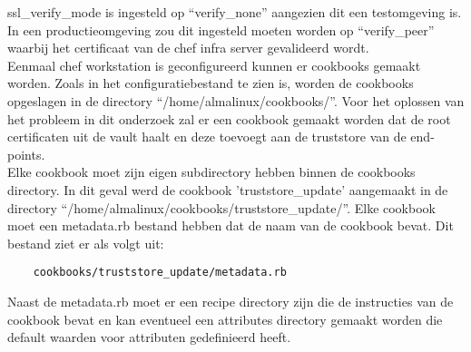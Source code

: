 ssl\_verify\_mode is ingesteld op ``verify\_none'' aangezien dit een testomgeving is. In een productieomgeving zou dit ingesteld moeten worden op ``verify\_peer'' waarbij het certificaat van de chef infra server gevalideerd wordt. \\

Eenmaal chef workstation is geconfigureerd kunnen er cookbooks gemaakt worden. Zoals in het configuratiebestand te zien is, worden de cookbooks opgeslagen in de directory ``/home/almalinux/cookbooks/''.
Voor het oplossen van het probleem in dit onderzoek zal er een cookbook gemaakt worden dat de root certificaten uit de vault haalt en deze toevoegt aan de truststore van de end-points. \\

Elke cookbook moet zijn eigen subdirectory hebben binnen de cookbooks directory.
In dit geval werd de cookbook 'truststore\_update' aangemaakt in de directory ``/home/almalinux/cookbooks/truststore\_update/''. Elke cookbook moet een metadata.rb bestand hebben dat de naam van de cookbook bevat. Dit bestand ziet er als volgt uit:
\begin{verbatim}
    cookbooks/truststore_update/metadata.rb
\end{verbatim}

Naast de metadata.rb moet er een recipe directory zijn die de instructies van de cookbook bevat en kan eventueel een attributes directory gemaakt worden die default waarden voor attributen gedefinieerd heeft. \\

